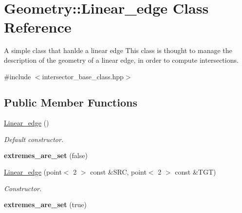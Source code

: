 \hypertarget{classGeometry_1_1Linear__edge}{
\section{Geometry::Linear\_\-edge Class Reference}
\label{classGeometry_1_1Linear__edge}
}


A simple class that hanlde a linear edge  This class is thought to manage the description of the geometry of a linear edge, in order to compute intersections.  


{\ttfamily \#include $<$intersector\_\-base\_\-class.hpp$>$}\subsection*{Public Member Functions}
\begin{DoxyCompactItemize}
\item 
\hypertarget{classGeometry_1_1Linear__edge_a7bc8e67881017b2f3a60b513f81aa45f}{
\hyperlink{classGeometry_1_1Linear__edge_a7bc8e67881017b2f3a60b513f81aa45f}{Linear\_\-edge} ()}
\label{classGeometry_1_1Linear__edge_a7bc8e67881017b2f3a60b513f81aa45f}

\begin{DoxyCompactList}\small\item\em Default constructor. \item\end{DoxyCompactList}\item 
\hypertarget{classGeometry_1_1Linear__edge_a2a06df3a5dcb107522b4cafb8b1794d2}{
{\bfseries extremes\_\-are\_\-set} (false)}
\label{classGeometry_1_1Linear__edge_a2a06df3a5dcb107522b4cafb8b1794d2}

\item 
\hypertarget{classGeometry_1_1Linear__edge_ac3cb6d63d81f758cae11b315c81acc6e}{
\hyperlink{classGeometry_1_1Linear__edge_ac3cb6d63d81f758cae11b315c81acc6e}{Linear\_\-edge} (point$<$ 2 $>$ const \&SRC, point$<$ 2 $>$ const \&TGT)}
\label{classGeometry_1_1Linear__edge_ac3cb6d63d81f758cae11b315c81acc6e}

\begin{DoxyCompactList}\small\item\em Constructor. \item\end{DoxyCompactList}\item 
\hypertarget{classGeometry_1_1Linear__edge_a6f209351de4a6d48f16f01ca7fd72633}{
{\bfseries extremes\_\-are\_\-set} (true)}
\label{classGeometry_1_1Linear__edge_a6f209351de4a6d48f16f01ca7fd72633}


\end{DoxyCompactItemize}
